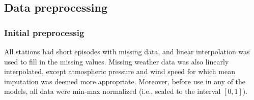 
\subsection{Data preprocessing}
\subsubsection{Initial preprocessig}
All stations had short episodes with missing data, and linear interpolation was used to fill in the missing values. Missing weather data was also linearly interpolated, except atmospheric pressure and wind speed for which mean imputation was deemed more appropriate. Moreover, before use in any of the models, all data were min-max normalized (i.e., scaled to the interval $[0,1]$). 

